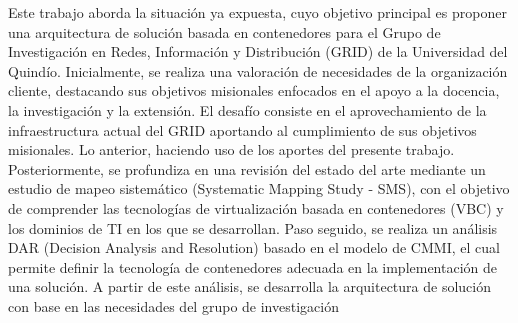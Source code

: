 Este trabajo aborda la situación ya expuesta, cuyo objetivo principal es proponer una arquitectura de solución basada en contenedores para el Grupo de Investigación en Redes, Información y Distribución (GRID) de la Universidad del Quindío. Inicialmente, se realiza una valoración de necesidades de la organización cliente, destacando sus objetivos misionales enfocados en el apoyo a la docencia, la investigación y la extensión. El desafío consiste en el aprovechamiento de la infraestructura actual del GRID aportando al cumplimiento de sus objetivos misionales. Lo anterior, haciendo uso de los aportes del presente trabajo. Posteriormente, se profundiza en una revisión del estado del arte mediante un estudio de mapeo sistemático (Systematic Mapping Study - SMS), con el objetivo de comprender las tecnologías de virtualización basada en contenedores (VBC) y los dominios de TI en los que se desarrollan. Paso seguido, se realiza un análisis DAR (Decision Analysis and Resolution) basado en el modelo de CMMI, el cual permite definir la tecnología de contenedores adecuada en la implementación de una solución. A partir de este análisis, se desarrolla la arquitectura de solución con base en las necesidades del grupo de investigación 